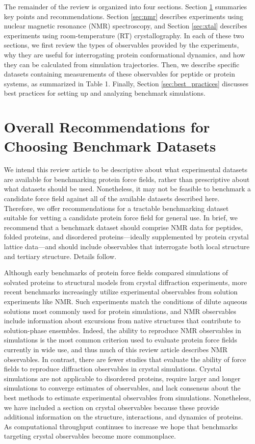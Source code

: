 \documentclass[9pt,review]{livecoms}
\begin{document}
The remainder of the review is organized into four sections.
Section \ref{sec:overall} summaries key points and recommendations.
Section \ref{sec:nmr} describes experiments using nuclear magnetic resonance (NMR) spectroscopy, and Section \ref{sec:xtal} describes experiments using room-temperature (RT) crystallography.
In each of these two sections, we first review the types of observables provided by the experiments, why they are useful for interrogating protein conformational dynamics, and how they can be calculated from simulation trajectories.
Then, we describe specific datasets containing measurements of these observables for peptide or protein systems, as summarized in Table 1.
Finally, Section \ref{sec:best_practices} discusses best practices for setting up and analyzing benchmark simulations.

\section{Overall Recommendations for Choosing Benchmark Datasets}
\label{sec:overall}

We intend this review article to be descriptive about what experimental datasets are available for benchmarking protein force fields, rather than prescriptive about what datasets should be used.
Nonetheless, it may not be feasible to benchmark a candidate force field against all of the available datasets described here.
Therefore, we offer recommendations for a tractable benchmarking dataset suitable for vetting a candidate protein force field for general use.
In brief, we recommend that a benchmark dataset should comprise NMR data for peptides, folded proteins, and disordered proteins---ideally supplemented by protein crystal lattice data---and should include observables that interrogate both local structure and tertiary structure.
Details follow.

Although early benchmarks of protein force fields compared simulations of solvated proteins to structural models from crystal diffraction experiments, more recent benchmarks increasingly utilize experimental observables from solution experiments like NMR.
Such experiments match the conditions of dilute aqueous solutions most commonly used for protein simulations, and NMR observables include information about excursions from native structures that contribute to solution-phase ensembles.
Indeed, the ability to reproduce NMR observables in simulations is the most common criterion used to evaluate protein force fields currently in wide use, and thus much of this review article describes NMR observables.
In contrast, there are fewer studies that evaluate the ability of force fields to reproduce diffraction observables in crystal simulations.
Crystal simulations are not applicable to disordered proteins, require larger and longer simulations to converge estimates of observables, and lack consensus about the best methods to estimate experimental observables from simulations.
Nonetheless, we have included a section on crystal observables because these provide additional information on the structure, interactions, and dynamics of proteins.
As computational throughput continues to increase we hope that benchmarks targeting crystal observables become more commonplace.
\end{document}

